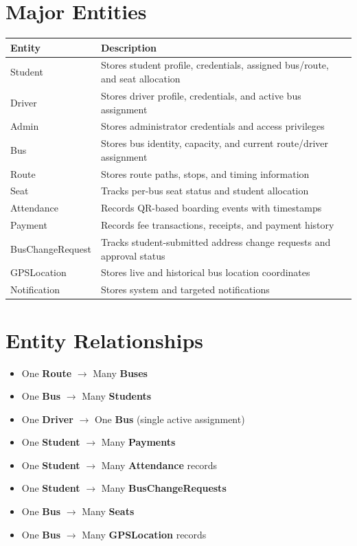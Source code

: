 \documentclass[11pt,a4paper]{report}
\begin{document}
\section{Major Entities}
\begin{longtable}{@{}p{3.4cm}p{10.7cm}@{}}
\toprule
\rowcolor{pine!10}\textbf{Entity} & \textbf{Description} \\
\midrule
\endhead
Student & Stores student profile, credentials, assigned bus/route, and seat allocation \\
Driver & Stores driver profile, credentials, and active bus assignment \\
Admin & Stores administrator credentials and access privileges \\
Bus & Stores bus identity, capacity, and current route/driver assignment \\
Route & Stores route paths, stops, and timing information \\
Seat & Tracks per-bus seat status and student allocation \\
Attendance & Records QR-based boarding events with timestamps \\
Payment & Records fee transactions, receipts, and payment history \\
BusChangeRequest & Tracks student-submitted address change requests and approval status \\
GPSLocation & Stores live and historical bus location coordinates \\
Notification & Stores system and targeted notifications \\
\bottomrule
\end{longtable}

\section{Entity Relationships}
\begin{itemize}[leftmargin=1.3em]
  \item One \textbf{Route} \(\rightarrow\) Many \textbf{Buses}
  \item One \textbf{Bus} \(\rightarrow\) Many \textbf{Students}
  \item One \textbf{Driver} \(\rightarrow\) One \textbf{Bus} (single active assignment)
  \item One \textbf{Student} \(\rightarrow\) Many \textbf{Payments}
  \item One \textbf{Student} \(\rightarrow\) Many \textbf{Attendance} records
  \item One \textbf{Student} \(\rightarrow\) Many \textbf{BusChangeRequests}
  \item One \textbf{Bus} \(\rightarrow\) Many \textbf{Seats}
  \item One \textbf{Bus} \(\rightarrow\) Many \textbf{GPSLocation} records
\end{itemize}
\end{document}
